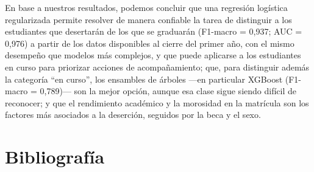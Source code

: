 \documentclass[titlepage,a4paper]{article}
\begin{document}
En base a nuestros resultados, podemos concluir que una regresión logística regularizada permite resolver de manera confiable la tarea de distinguir a los estudiantes que desertarán de los que se graduarán (F1-macro = 0,937; AUC = 0,976) a partir de los datos disponibles al cierre del primer año, con el mismo desempeño que modelos más complejos, y que puede aplicarse a los estudiantes en curso para priorizar acciones de acompañamiento; que, para distinguir además la categoría ``en curso'', los ensambles de árboles ---en particular XGBoost (F1-macro = 0,789)--- son la mejor opción, aunque esa clase sigue siendo difícil de reconocer; y que el rendimiento académico y la morosidad en la matrícula son los factores más asociados a la deserción, seguidos por la beca y el sexo.

\section*{Bibliografía}\label{sec:bibliografia}
\end{document}
